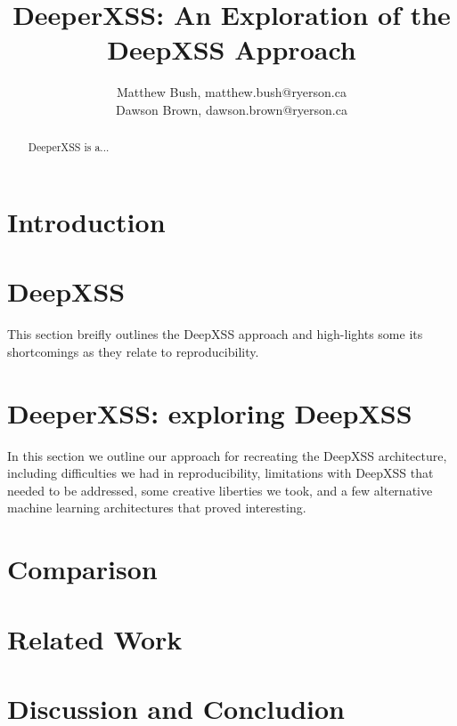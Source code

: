\documentclass{llncs}
\title{DeeperXSS: An Exploration of the DeepXSS Approach}
\author{Matthew Bush, matthew.bush@ryerson.ca\\Dawson Brown, dawson.brown@ryerson.ca}
\institute{Ryerson University}
\date{}
\begin{document}
\maketitle
\pagestyle{plain}

\begin{abstract}
DeeperXSS is a...

\end{abstract}


\section{Introduction}



\section{DeepXSS}
This section breifly outlines the DeepXSS approach and high-lights some its shortcomings as they relate to reproducibility.



\section{DeeperXSS: exploring DeepXSS}
In this section we outline our approach for recreating the DeepXSS architecture, including difficulties we had in reproducibility, limitations with DeepXSS that needed to be addressed, some creative liberties we took, and a few alternative machine learning architectures that proved interesting. 



\section{Comparison}



\section{Related Work}



\section{Discussion and Concludion}



\newpage


\end{document}
